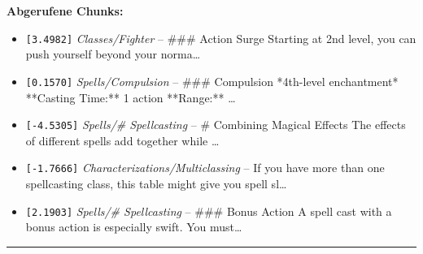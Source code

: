 \noindent\textbf{Abgerufene Chunks:}
\begin{itemize}[noitemsep, topsep=2pt]
  \item[\textbf{\#1}] \texttt{[3.4982]} \textit{Classes/Fighter} -- \#\#\# Action Surge  Starting at 2nd level, you can push yourself beyond your norma\ldots
  \item[\textbf{\#2}] \texttt{[0.1570]} \textit{Spells/Compulsion} -- \#\#\# Compulsion  *4th-level enchantment*  **Casting Time:** 1 action  **Range:** \ldots
  \item[\textbf{\#3}] \texttt{[-4.5305]} \textit{Spells/# Spellcasting} -- \# Combining Magical Effects  The effects of different spells add together while \ldots
  \item[\textbf{\#4}] \texttt{[-1.7666]} \textit{Characterizations/Multiclassing} -- If you have more than one spellcasting class, this table might give you spell sl\ldots
  \item[\textbf{\#5}] \texttt{[2.1903]} \textit{Spells/# Spellcasting} -- \#\#\# Bonus Action  A spell cast with a bonus action is especially swift. You must\ldots
\end{itemize}
\vspace{4pt}
\hrule
\vspace{6pt}
